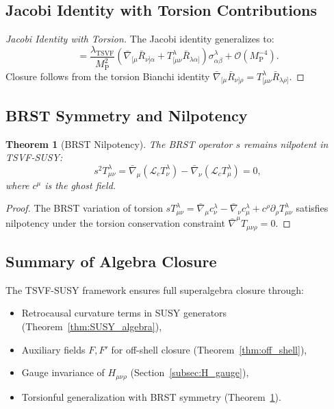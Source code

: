 \documentclass[12pt, onecolumn]{article}
\newtheorem{theorem}{Theorem}[section]
\theoremstyle{definition}
\newcommand{\tsvf}{\lambda_{\mathrm{TSVF}}}
\newcommand{\Mp}{M_{\mathrm{P}}}
\numberwithin{equation}{section}
\begin{document}
\subsection{Jacobi Identity with Torsion Contributions} 
\label{subsec:Jacobi_torsion}

\begin{proof}[Jacobi Identity with Torsion]
The Jacobi identity generalizes to:
\begin{equation}
[Q_\alpha, \{ Q_\beta, A_\mu \}] = \frac{\tsvf}{\Mp^2}\left(\bar{\nabla}_{[\mu}\bar{R}_{\nu]\alpha} + T^\lambda_{[\mu\nu}\bar{R}_{\lambda\alpha]}\right)\sigma^\lambda_{\alpha\beta} + \mathcal{O}(\Mp^{-4}).
\label{eq:Jacobi_torsion}
\end{equation}
Closure follows from the torsion Bianchi identity \(\bar{\nabla}_{[\mu}\bar{R}_{\nu]\rho} = T^\lambda_{[\mu\nu}\bar{R}_{\lambda\rho]}\). \qedhere
\end{proof}

\subsection{BRST Symmetry and Nilpotency} 
\label{subsec:BRST}

\begin{theorem}[BRST Nilpotency]
\label{thm:BRST}
The BRST operator \(s\) remains nilpotent in TSVF-SUSY:
\begin{equation}
s^2 T^\lambda_{\mu\nu} = \bar{\nabla}_\mu(\mathcal{L}_c T^\lambda_\nu) - \bar{\nabla}_\nu(\mathcal{L}_c T^\lambda_\mu) = 0,
\label{eq:BRST_nilpotent}
\end{equation}
where \(c^\mu\) is the ghost field.
\end{theorem}

\begin{proof}
The BRST variation of torsion \(s T^\lambda_{\mu\nu} = \bar{\nabla}_\mu c^\lambda_\nu - \bar{\nabla}_\nu c^\lambda_\mu + c^\rho \partial_\rho T^\lambda_{\mu\nu}\) satisfies nilpotency under the torsion conservation constraint \(\bar{\nabla}^\mu T_{\mu\nu\rho} = 0\). \qedhere
\end{proof}

\subsection{Summary of Algebra Closure} 
\label{subsec:closure_summary}

The TSVF-SUSY framework ensures full superalgebra closure through:
\begin{itemize}
\item Retrocausal curvature terms in SUSY generators (Theorem~\ref{thm:SUSY_algebra}),
\item Auxiliary fields \(F, F'\) for off-shell closure (Theorem~\ref{thm:off_shell}),
\item Gauge invariance of \(H_{\mu\nu\rho}\) (Section~\ref{subsec:H_gauge}),
\item Torsionful generalization with BRST symmetry (Theorem~\ref{thm:BRST}).
\end{itemize}
\end{document}

